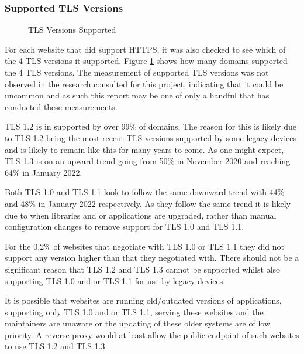 \documentclass{mscreport}
\begin{document}
\clearpage
\newpage


\subsubsection{Supported TLS Versions}

\begin{figure}[H]
	\begin{center}
		\caption{TLS Versions Supported}
		\label{fig:tls_verions_supported}
	\end{center}
\end{figure}

\noindent
For each website that did support HTTPS, it was also checked to see which of the 4 TLS versions it supported. Figure \ref{fig:tls_verions_supported} shows how many domains supported the 4 TLS versions. The measurement of supported TLS versions was not observed in the research consulted for this project, indicating that it could be uncommon and as such this report may be one of only a handful that has conducted these measurements.

\vspace{0.3cm} \noindent
TLS 1.2 is in supported by over 99\% of domains. The reason for this is likely due to TLS 1.2 being the most recent TLS versions supported by some legacy devices and is likely to remain like this for many years to come. As one might expect, TLS 1.3 is on an upward trend going from 50\% in November 2020 and reaching 64\% in January 2022.

\vspace{0.3cm} \noindent
Both TLS 1.0 and TLS 1.1 look to follow the same downward trend with 44\% and 48\% in January 2022 respectively. As they follow the same trend it is likely due to when libraries and or applications are upgraded, rather than manual configuration changes to remove support for TLS 1.0 and TLS 1.1.

\vspace{0.3cm} \noindent
For the 0.2\% of websites that negotiate with TLS 1.0 or TLS 1.1 they did not support any version higher than that they negotiated with. There should not be a significant reason that TLS 1.2 and TLS 1.3 cannot be supported whilst also supporting TLS 1.0 and or TLS 1.1 for use by legacy devices. 

\vspace{0.3cm} \noindent
It is possible that websites are running old/outdated versions of applications, supporting only TLS 1.0 and or TLS 1.1, serving these websites and the maintainers are unaware or the updating of these older systems are of low priority. A reverse proxy would at least allow the public endpoint of such websites to use TLS 1.2 and TLS 1.3.
\end{document}
